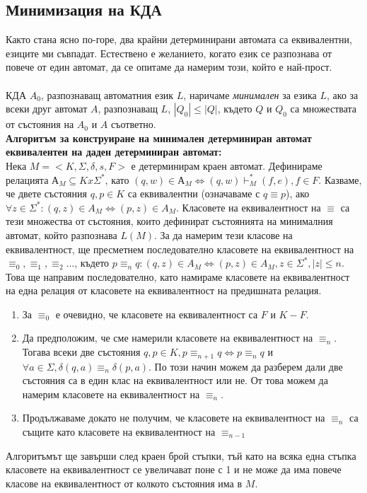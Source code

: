 \documentclass[11pt]{article}
\begin{document}
\subsection{Минимизация на КДА}
Както стана ясно по-горе, два крайни детерминирани автомата са еквивалентни, езиците ми съвпадат. Естествено е желанието, когато език се разпознава от повече от един автомат, да се опитаме да намерим този, който е най-прост.\\\\
 КДА $A_{0}$, разпознаващ автоматния език $L$, наричаме \emph{минимален} за езика $L$, ако за всеки друг автомат $A$, разпознаващ $L$, $|Q_{0}| \leq |Q|$, където $Q$ и $Q_{0}$ са множествата от състояния на $A_{0}$ и $A$ съответно. \\

\textbf{Алгоритъм за конструиране на минимален детерминиран автомат еквивалентен на даден детерминиран автомат:}\\
Нека $M = <K, \Sigma, \delta, s, F>$ е детерминирам краен автомат. Дефинираме релацията $А_{M} \subseteq K x \Sigma^{*}$, като $(q, w) \in А_{M} \iff (q, w) \vdash^{*}_{M} (f, e), f \in F$. Казваме, че двете състояния $q, p \in K$ са еквивалентни (означаваме с $q \equiv p$), ако $\forall z \in \Sigma^{*} : (q, z) \in A_{M} \iff (p, z) \in A_{M}$. Класовете на еквивалентност на $\equiv$ са тези множества от състояния, които дефинират състоянията на минималния автомат, който разпознава $L(M)$. За да намерим тези класове на еквивалентност, ще пресметнем последователно класовете на еквивалентност на $\equiv_{0}, \equiv_{1}, \equiv_{2}...$, където $p \equiv_{n} q : (q, z) \in A_{M} \iff (p, z) \in A_{M}, z \in \Sigma^{*}, |z| \leq n$. Това ще направим последователно, като намираме класовете на еквивалентност на една релация от класовете на еквивалентност на предишната релация.
\renewcommand{\theenumi}{\arabic{enumi}}
\begin{enumerate}
	\item За $\equiv_{0}$ е очевидно, че класовете на еквивалентност са $F$ и $K-F$.
	\item Да предположим, че сме намерили класовете на еквивалентност на $\equiv_{n}$. Тогава всеки две състояния $q, p \in K, p \equiv_{n+1} q \iff p \equiv_{n} q$ и $\forall a \in \Sigma, \delta(q, a) \equiv_{n} \delta(p, a)$. По този начин можем да разберем дали две състояния са в един клас на еквивалентност или не. От това можем да намерим класовете на еквивалентност на $\equiv_{n}$.
	\item Продължаваме докато не получим, че класовете на еквивалентност на $\equiv_{n}$ са същите като класовете на еквивалентност на $\equiv_{n-1}$
\end{enumerate}
Алгоритъмът ще завърши след краен брой стъпки, тъй като на всяка една стъпка класовете на еквивалентност се увеличават поне с 1 и не може да има повече класове на еквивалентност от колкото състояния има в $M$.
\end{document}
